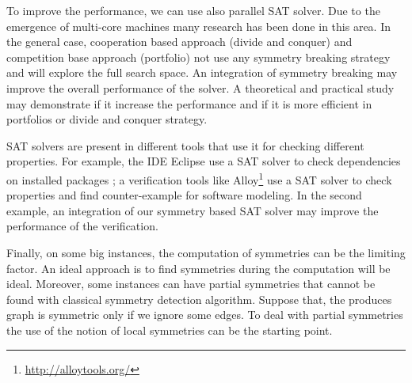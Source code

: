To improve the performance, we can use also parallel SAT solver. Due to the emergence of multi-core machines
many research has been done in this area. In the general case, cooperation based approach (divide and conquer) and
competition base approach (portfolio)  not use any symmetry breaking strategy and will explore the full search space.
An integration of symmetry breaking may improve the overall performance of the solver.
A theoretical and practical study may demonstrate if it increase the performance and if it is more efficient in 
portfolios or divide and conquer strategy.


SAT solvers are present in different tools that use it for checking different properties. For example, 
the IDE Eclipse use a SAT solver to check dependencies on installed packages \cite{le2008sat};
a verification tools like Alloy\footnote{\url{http://alloytools.org/}} use a SAT solver to check properties and find
counter-example for software modeling. In the second example, an integration of our symmetry based SAT solver may improve the performance of the verification.


Finally, on some big instances, the computation of symmetries can be the limiting factor. An ideal approach is to find 
symmetries during the computation will be ideal. %
Moreover, some instances can have partial symmetries that cannot be 
found with classical symmetry detection algorithm. Suppose that, the produces graph is symmetric only if we ignore some 
edges. To deal with partial symmetries the use of the notion of local symmetries can be the starting point.


 
